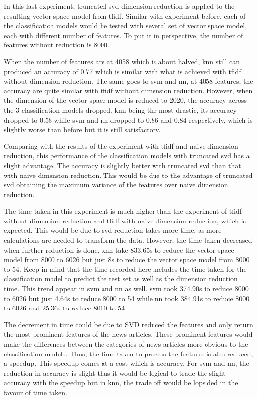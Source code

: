 In this last experiment, truncated \ac{svd} dimension reduction is applied to the resulting vector space model from \ac{tfidf}. Similar with experiment before, each of the classification models would be tested with several set of vector space model, each with different number of features. To put it in perspective, the number of features without reduction is 8000. 

When the number of features are at 4058 which is about halved, \ac{knn} still can produced an accuracy of 0.77 which is similar with what is achieved with \ac{tfidf} without dimension reduction. The same goes to \ac{svm} and \ac{nn}, at 4058 features, the accuracy are quite similar with \ac{tfidf} without dimension reduction. However, when the dimension of the vector space model is reduced to 2020, the accuracy across the 3 classification models dropped. \Ac{knn} being the most drastic, its accuracy dropped to 0.58 while \ac{svm} and \ac{nn} dropped to 0.86 and 0.84 respectively, which is slightly worse than before but it is still satisfactory.

Comparing with the results of the experiment with \ac{tfidf} and naive dimension reduction, this performance of the classification models with truncated \ac{svd} has a slight advantage. The accuracy is slightly better with truncated \ac{svd} than that with naive dimension reduction. This would be due to the advantage of truncated \ac{svd} obtaining the maximum variance of the features over naive dimension reduction.

The time taken in this experiment is much higher than the experiment of \ac{tfidf} without dimension reduction and \ac{tfidf} with naive dimension reduction, which is expected. This would be due to \ac{svd} reduction takes more time, as more calculations are needed to transform the data. However, the time taken decreased when further reduction is done, \ac{knn} take 833.65s to reduce the vector space model from 8000 to 6026 but just 8s to reduce the vector space model from 8000 to 54. Keep in mind that the time recorded here includes the time taken for the classification model to predict the test set as well as the dimension reduction time. This trend appear in \ac{svm} and \ac{nn} as well. \Ac{svm} took 374.90s to reduce 8000 to 6026 but just 4.64s to reduce 8000 to 54 while \ac{nn} took 384.91s to reduce 8000 to 6026 and 25.36s to reduce 8000 to 54. 

The decrement in time could be due to SVD reduced the features and only return the most prominent features of the news articles. These prominent features would make the differences between the categories of news articles more obvious to the classification models. Thus, the time taken to process the features is also reduced, a speedup. This speedup comes at a cost which is accuracy. For \ac{svm} and \ac{nn}, the reduction in accuracy is slight thus it would be logical to trade the slight accuracy with the speedup but in \ac{knn}, the trade off would be lopsided in the favour of time taken.\\

